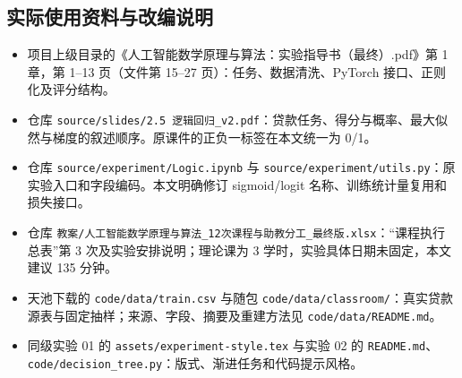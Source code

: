 \documentclass[UTF8,a4paper,11pt,fontset=fandol]{ctexart}
\newcommand{\file}[1]{\nolinkurl{#1}}
\begin{document}
\subsection{实际使用资料与改编说明}
\begin{itemize}
\item 项目上级目录的《人工智能数学原理与算法：实验指导书（最终）.pdf》第 1 章，第 1--13 页（文件第 15--27 页）：任务、数据清洗、PyTorch 接口、正则化及评分结构。
\item 仓库 \texttt{source/\allowbreak{}slides/\allowbreak{}2.5 逻辑回归\_\allowbreak{}v2.pdf}：贷款任务、得分与概率、最大似然与梯度的叙述顺序。原课件的正负一标签在本文统一为 0/1。
\item 仓库 \file{source/experiment/Logic.ipynb} 与 \file{source/experiment/utils.py}：原实验入口和字段编码。本文明确修订 sigmoid/logit 名称、训练统计量复用和损失接口。
\item 仓库 \texttt{教案/\allowbreak{}人工智能数学原理与算法\_\allowbreak{}12次课程与助教分工\_\allowbreak{}最终版.xlsx}：“课程执行总表”第 3 次及实验安排说明；理论课为 3 学时，实验具体日期未固定，本文建议 135 分钟。
\item 天池下载的 \file{code/data/train.csv} 与随包 \file{code/data/classroom/}：真实贷款源表与固定抽样；来源、字段、摘要及重建方法见 \file{code/data/README.md}。
\item 同级实验 01 的 \file{assets/experiment-style.tex} 与实验 02 的 \file{README.md}、\file{code/decision_tree.py}：版式、渐进任务和代码提示风格。
\end{itemize}
\end{document}
